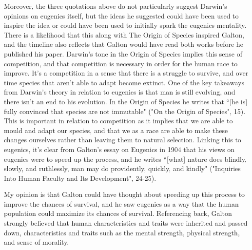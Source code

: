 \documentclass[11pt, oneside]{article}
\begin{document}

\par Moreover, the three quotations above do not particularly suggest Darwin's opinions on eugenics itself, but the ideas he suggested could have been used to inspire the idea or could have been used to initially spark the eugenics mentality. There is a likelihood that this along with The Origin of Species inspired Galton, and the timeline also reflects that Galton would have read both works before he published his paper. Darwin's tone in the Origin of Species implies this sense of competition, and that competition is necessary in order for the human race to improve. It's a competition in a sense that there is a struggle to survive, and over time species that aren't able to adapt become extinct. One of the key takeaways from Darwin's theory in relation to eugenics is that man is still evolving, and there isn't an end to his evolution. In the Origin of Species he writes that ``[he is] fully convinced that species are not immutable" ("On the Origin of Species", 15). This is important in relation to competition as it implies that we are able to mould and adapt our species, and that we as a race are able to make these changes ourselves rather than leaving them to natural selection. Linking this to eugenics, it's clear from Galton's essay on Eugenics in 1904 that his views on eugenics were to speed up the process, and he writes ``[what] nature does blindly, slowly, and ruthlessly, man may do providently, quickly, and kindly" ("Inquiries Into Human Faculty and Its Development", 24-25). 

\par My opinion is that Galton could have thought about speeding up this process to improve the chances of survival, and he saw eugenics as a way that the human population could maximize its chances of survival. Referencing back, Galton strongly believed that human characteristics and traits were inherited and passed down, characteristics and traits such as the mental strength, physical strength, and sense of morality. 
\end{document}
